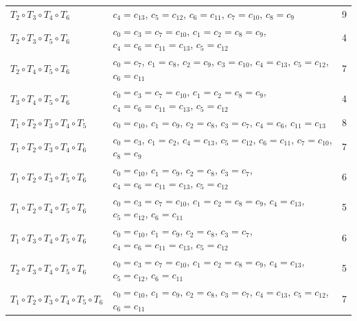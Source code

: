 \documentclass{article}
\begin{document}
{\begin{longtable}{l l c}
$T_2 \circ T_3 \circ T_4 \circ T_6$ & $c_4 = c_{13}$, $c_5 = c_{12}$, $c_6 = c_{11}$, $c_7 = c_{10}$, $c_8 = c_9$ & 9 \\
$T_2 \circ T_3 \circ T_5 \circ T_6$ & $c_0 = c_3 = c_7 = c_{10}$, $c_1 = c_2 = c_8 = c_9$, $c_4 = c_6 = c_{11} = c_{13}$, $c_5 = c_{12}$ & 4 \\
$T_2 \circ T_4 \circ T_5 \circ T_6$ & $c_0 = c_7$, $c_1 = c_8$, $c_2 = c_9$, $c_3 = c_{10}$, $c_4 = c_{13}$, $c_5 = c_{12}$, $c_6 = c_{11}$ & 7 \\
$T_3 \circ T_4 \circ T_5 \circ T_6$ & $c_0 = c_3 = c_7 = c_{10}$, $c_1 = c_2 = c_8 = c_9$, $c_4 = c_6 = c_{11} = c_{13}$, $c_5 = c_{12}$ & 4 \\
$T_1 \circ T_2 \circ T_3 \circ T_4 \circ T_5$ & $c_0 = c_{10}$, $c_1 = c_9$, $c_2 = c_8$, $c_3 = c_7$, $c_4 = c_6$, $c_{11} = c_{13}$ & 8 \\
$T_1 \circ T_2 \circ T_3 \circ T_4 \circ T_6$ & $c_0 = c_3$, $c_1 = c_2$, $c_4 = c_{13}$, $c_5 = c_{12}$, $c_6 = c_{11}$, $c_7 = c_{10}$, $c_8 = c_9$ & 7 \\
$T_1 \circ T_2 \circ T_3 \circ T_5 \circ T_6$ & $c_0 = c_{10}$, $c_1 = c_9$, $c_2 = c_8$, $c_3 = c_7$, $c_4 = c_6 = c_{11} = c_{13}$, $c_5 = c_{12}$ & 6 \\
$T_1 \circ T_2 \circ T_4 \circ T_5 \circ T_6$ & $c_0 = c_3 = c_7 = c_{10}$, $c_1 = c_2 = c_8 = c_9$, $c_4 = c_{13}$, $c_5 = c_{12}$, $c_6 = c_{11}$ & 5 \\
$T_1 \circ T_3 \circ T_4 \circ T_5 \circ T_6$ & $c_0 = c_{10}$, $c_1 = c_9$, $c_2 = c_8$, $c_3 = c_7$, $c_4 = c_6 = c_{11} = c_{13}$, $c_5 = c_{12}$ & 6 \\
$T_2 \circ T_3 \circ T_4 \circ T_5 \circ T_6$ & $c_0 = c_3 = c_7 = c_{10}$, $c_1 = c_2 = c_8 = c_9$, $c_4 = c_{13}$, $c_5 = c_{12}$, $c_6 = c_{11}$ & 5 \\
$T_1 \circ T_2 \circ T_3 \circ T_4 \circ T_5 \circ T_6$ & $c_0 = c_{10}$, $c_1 = c_9$, $c_2 = c_8$, $c_3 = c_7$, $c_4 = c_{13}$, $c_5 = c_{12}$, $c_6 = c_{11}$ & 7 \\
\end{longtable}%
}
\end{document}
